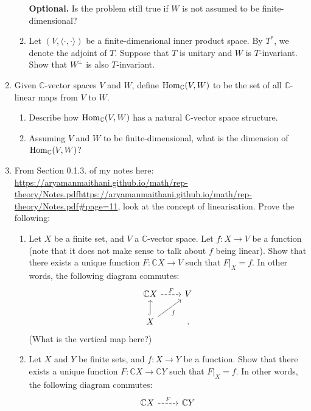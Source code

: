 \documentclass[12pt]{article}
\begin{document}
\begin{enumerate}
\begin{enumerate}
		{\color{red}\textbf{Optional.} Is the problem still true if $W$ is not assumed to be finite-dimensional?}
		\item Let $(V, \langle \cdot, \cdot\rangle)$ be a finite-dimensional inner product space. By $T^{\ast}$, we denote the adjoint of $T$. Suppose that $T$ is unitary and $W$ is $T$-invariant. Show that $W^{\perp}$ is also $T$-invariant.
	\end{enumerate}
	\item Given $\mathbb{C}$-vector spaces $V$ and $W$, define $\operatorname{Hom}_{\mathbb{C}}(V, W)$ to be the set of all $\mathbb{C}$-linear maps from $V$ to $W$.
	\begin{enumerate}
		\item Describe how $\operatorname{Hom}_{\mathbb{C}}(V, W)$ has a natural $\mathbb{C}$-vector space structure.
		\item Assuming $V$ and $W$ to be finite-dimensional, what is the dimension of $\operatorname{Hom}_{\mathbb{C}}(V, W)$?
	\end{enumerate}
	\item From Section 0.1.3. of my notes here: \url{https://aryamanmaithani.github.io/math/rep-theory/Notes.pdfhttps://aryamanmaithani.github.io/math/rep-theory/Notes.pdf#page=11}, look at the concept of linearisation. Prove the following:
	\begin{enumerate}
		\item Let $X$ be a finite set, and $V$ a $\mathbb{C}$-vector space. Let $f : X \to V$ be a function (note that it does not make sense to talk about $f$ being linear). Show that there exists a unique function $F : \mathbb{C}X \to V$ such that $F|_{X} = f$. In other words, the following diagram commutes:
		\begin{equation*} 
			\begin{tikzcd}
				\mathbb{C}X \arrow[r, "F", dashed] & V \\
				X \arrow[u, hook] \arrow[ru, "f"'] & .
			\end{tikzcd}
		\end{equation*}
		(What is the vertical map here?)
		\item Let $X$ and $Y$ be finite sets, and $f : X \to Y$ be a function. Show that there exists a unique function $F : \mathbb{C}X \to \mathbb{C}Y$ such that $F|_{X} = f$. In other words, the following diagram commutes:
		\begin{equation*} 
			\begin{tikzcd}
				\mathbb{C}X \arrow[r, "F", dashed] & \mathbb{C}Y \\

\end{tikzcd}
\end{equation*}
\end{enumerate}
\end{enumerate}
\end{document}
